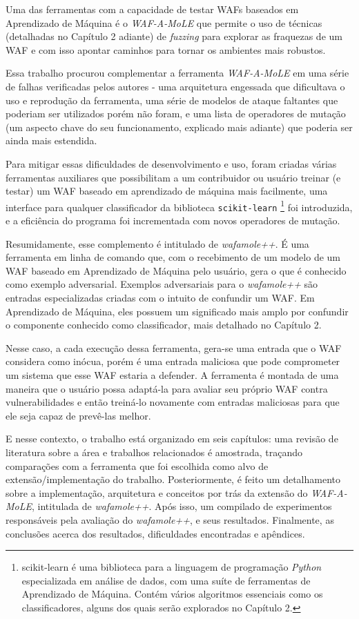 Uma das ferramentas com a capacidade de testar WAFs baseados em Aprendizado de Máquina é o \textit{WAF-A-MoLE} \cite{valenza_waf--mole_2020} que permite o uso de técnicas (detalhadas no Capítulo 2 adiante) de \textit{fuzzing} \cite{fuzzing_book} para explorar as fraquezas de um WAF e com isso apontar caminhos para tornar os ambientes mais robustos.

Essa trabalho procurou complementar a ferramenta \textit{WAF-A-MoLE} em uma série de falhas verificadas pelos autores - uma arquitetura engessada que dificultava o uso e reprodução da ferramenta, uma série de modelos de ataque faltantes que poderiam ser utilizados porém não foram, e uma lista de operadores de mutação (um aspecto chave do seu funcionamento, explicado mais adiante) que poderia ser ainda mais estendida. 

Para mitigar essas dificuldades de desenvolvimento e uso, foram criadas várias ferramentas auxiliares que possibilitam a um contribuidor ou usuário treinar (e testar) um WAF baseado em aprendizado de máquina mais facilmente, uma interface para qualquer classificador da biblioteca \verb+scikit-learn+ \footnote{scikit-learn é uma biblioteca para a linguagem de programação \textit{Python} especializada em análise de dados, com uma suíte de ferramentas de Aprendizado de Máquina. Contém vários algoritmos essenciais como os classificadores, alguns dos quais serão explorados no Capítulo 2.} foi introduzida, e a eficiência do programa foi incrementada com novos operadores de mutação.

Resumidamente, esse complemento é intitulado de \textit{wafamole++}. É uma ferramenta em linha de comando que, com o recebimento de um modelo de um WAF baseado em Aprendizado de Máquina pelo usuário, gera o que é conhecido como exemplo adversarial. Exemplos adversariais para o \textit{wafamole++} são entradas especializadas criadas com o intuito de confundir um WAF. Em Aprendizado de Máquina, eles possuem um significado mais amplo por confundir o componente conhecido como classificador, mais detalhado no Capítulo 2.

Nesse caso, a cada execução dessa ferramenta, gera-se uma entrada que o WAF considera como inócua, porém é uma entrada maliciosa que pode comprometer um sistema que esse WAF estaria a defender. A ferramenta é montada de uma maneira que o usuário possa adaptá-la para avaliar seu próprio WAF contra vulnerabilidades e então treiná-lo novamente com entradas maliciosas para que ele seja capaz de prevê-las melhor.

E nesse contexto, o trabalho está organizado em seis capítulos: uma revisão de literatura sobre a área e trabalhos relacionados é amostrada, traçando comparações com a ferramenta que foi escolhida como alvo de extensão/implementação do trabalho. Posteriormente, é feito um detalhamento sobre a implementação, arquitetura e conceitos por trás da extensão do \textit{WAF-A-MoLE}, intitulada de \textit{wafamole++}. Após isso, um compilado de experimentos responsáveis pela avaliação do \textit{wafamole++}, e seus resultados. Finalmente, as conclusões acerca dos resultados, dificuldades encontradas e apêndices.

\bigskip
